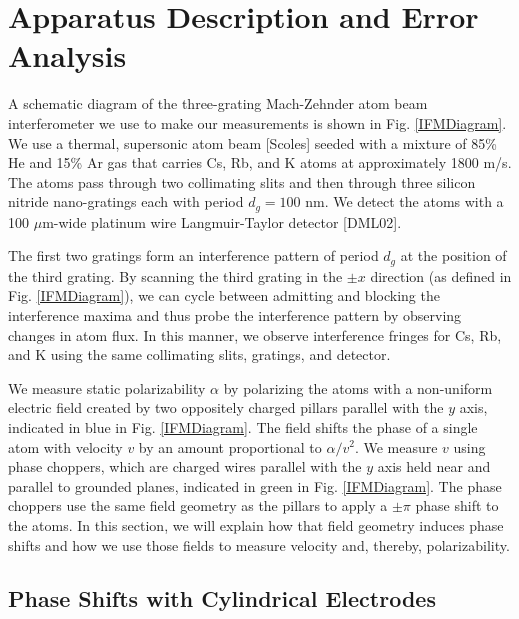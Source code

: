 \documentclass[twocolumn, prl,showpacs,superscriptaddress]{revtex4-1}   %
\newcommand{\figref}[1]{Fig. \ref{#1}}
\begin{document}
\section{Apparatus Description and Error Analysis}

A schematic diagram of the three-grating Mach-Zehnder atom beam interferometer we use to make our measurements is shown in \figref{IFMDiagram}. We use a thermal, supersonic atom beam [Scoles] seeded with a mixture of 85\% He and 15\% Ar gas that carries Cs, Rb, and K atoms at approximately 1800 m/s. 
The atoms pass through two collimating slits and then through three silicon nitride nano-gratings each with period $d_g = 100$ nm. We detect the atoms with a 100 $\mu$m-wide platinum wire Langmuir-Taylor detector [DML02].

The first two gratings form an interference pattern of period $d_g$ at the position of the third grating. By scanning the third grating in the $\pm x$ direction (as defined in \figref{IFMDiagram}), we can cycle between admitting and blocking the interference maxima and thus probe the interference pattern by observing changes in atom flux. In this manner, we observe interference fringes for Cs, Rb, and K using the same collimating slits, gratings, and detector.

We measure static polarizability $\alpha$ by polarizing the atoms with a non-uniform electric field created by two oppositely charged pillars parallel with the $y$ axis, indicated in blue in \figref{IFMDiagram}. The field shifts the phase of a single atom with velocity $v$ by an amount proportional to $\alpha/v^2$. We measure $v$ using phase choppers, which are charged wires parallel with the $y$ axis held near and parallel to grounded planes, indicated in green in \figref{IFMDiagram}. The phase choppers use the same field geometry as the pillars to apply a $\pm\pi$ phase shift to the atoms. In this section, we will explain how that field geometry induces phase shifts and how we use those fields to measure velocity and, thereby, polarizability. 

\subsection{Phase Shifts with Cylindrical Electrodes}
 
\end{document}
